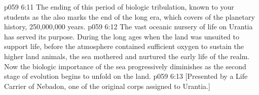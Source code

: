 \vs p059 6:11 The ending of this period of biologic tribulation, known to your students as the  also marks the end of the long  era, which covers  of the planetary history, 250,000,000 years.
\vs p059 6:12 The vast oceanic nursery of life on Urantia has served its purpose. During the long ages when the land was unsuited to support life, before the atmosphere contained sufficient oxygen to sustain the higher land animals, the sea mothered and nurtured the early life of the realm. Now the biologic importance of the sea progressively diminishes as the second stage of evolution begins to unfold on the land.
\vsetoff
\vs p059 6:13 [Presented by a Life Carrier of Nebadon, one of the original corps assigned to Urantia.]
\quizlink
